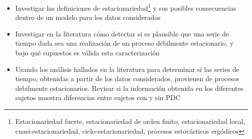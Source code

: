\begin{itemize}
\item Investigar las definiciones de estacionariedad\footnote{Estacionariedad fuerte, 
estacionariedad de orden finito, estacionariedad local, cuasi-estacionariedad,
ciclo-estacionariedad, procesos estoc\'asticos erg\'odicos} y sus posibles consecuencias dentro
de un modelo para los datos considerados

\item Investigar en la literatura c\'omo detectar si es plausible que una serie de tiempo 
dada sea una realizaci\'on de un proceso d\'ebilmente estacionario, 
y bajo qu\'e supuestos es v\'alida esta caracterizaci\'on

\item Usando los an\'alisis hallados en la literatura para determinar si las series de tiempo,
obtenidas a partir de los datos considerados, provienen de procesos
debilmente estacionarios.
Revisar si la informaci\'on obtenida en los diferentes sujetos muestra diferencias entre
sujetos con y sin PDC


\end{itemize}


